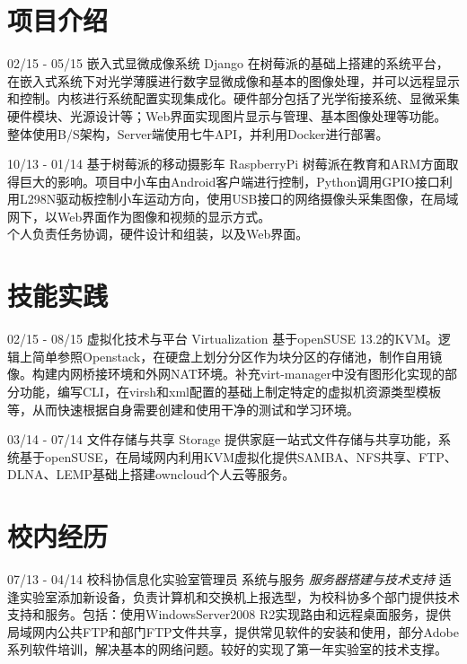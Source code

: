 \documentclass[]{friggeri-cv}
\begin{document}
\section{项目介绍}
\begin{entrylist}
  \entry
    {02/15 - 05/15}
    {嵌入式显微成像系统}
    {Django}
    {在树莓派的基础上搭建的系统平台，在嵌入式系统下对光学薄膜进行数字显微成像和基本的图像处理，并可以远程显示和控制。内核进行系统配置实现集成化。硬件部分包括了光学衔接系统、显微采集硬件模块、光源设计等；Web界面实现图片显示与管理、基本图像处理等功能。\\
    整体使用B/S架构，Server端使用七牛API，并利用Docker进行部署。
   \\ }%

   \entry
   {10/13 - 01/14}
   {基于树莓派的移动摄影车}
   {RaspberryPi}
   {
    树莓派在教育和ARM方面取得巨大的影响。项目中小车由Android客户端进行控制，Python调用GPIO接口利用L298N驱动板控制小车运动方向，使用USB接口的网络摄像头采集图像，在局域网下，以Web界面作为图像和视频的显示方式。\\
    个人负责任务协调，硬件设计和组装，以及Web界面。
   }
   
\end{entrylist}

\section{技能实践}
\begin{entrylist}
  \entry
    {02/15 - 08/15 }
    {虚拟化技术与平台}
    {Virtualization}
    {基于openSUSE 13.2的KVM。逻辑上简单参照Openstack，在硬盘上划分分区作为块分区的存储池，制作自用镜像。构建内网桥接环境和外网NAT环境。补充virt-manager中没有图形化实现的部分功能，编写CLI，在virsh和xml配置的基础上制定特定的虚拟机资源类型模板等，从而快速根据自身需要创建和使用干净的测试和学习环境。
    \\}   
	{
	
	
	}
  \entry
    {03/14 - 07/14 }
    {文件存储与共享}
    {Storage}
    {提供家庭一站式文件存储与共享功能，系统基于openSUSE，在局域网内利用KVM虚拟化提供SAMBA、NFS共享、FTP、DLNA、LEMP基础上搭建owncloud个人云等服务。\\}%
    



\end{entrylist}

\section{校内经历}
\begin{entrylist}
  \entry
    {07/13 - 04/14}
    {校科协信息化实验室管理员}
    {系统与服务}
    {\emph{服务器搭建与技术支持}
    适逢实验室添加新设备，负责计算机和交换机上报选型，为校科协多个部门提供技术支持和服务。包括：使用WindowsServer2008 R2实现路由和远程桌面服务，提供局域网内公共FTP和部门FTP文件共享，提供常见软件的安装和使用，部分Adobe系列软件培训，解决基本的网络问题。较好的实现了第一年实验室的技术支撑。  \\     
    }
    
\end{entrylist}
\end{document}

